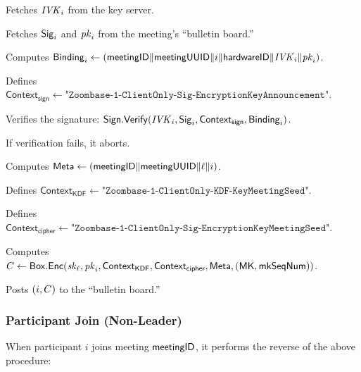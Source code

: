 \begingroup
\RaggedRight
\begin{enumerate*}
\item Fetches $\mathit{IVK}_i$ from the key server.
\item Fetches ${\sf Sig}_i$ and $\mathit{pk}_i$ from the meeting's ``bulletin board.''
\item Computes ${\sf Binding}_i \leftarrow \left( {\sf meetingID} \| \allowbreak {\sf meetingUUID} \| i \allowbreak
\| {\sf hardwareID} \| \mathit{IVK}_i \| \allowbreak \mathit{pk}_i \right)$.
\item Defines $\textsf{Context}_\textsf{sign} \leftarrow
\texttt{"Zoombase-1-ClientOnly-Sig-EncryptionKeyAnnouncement"}$.
\item Verifies the signature: ${\sf Sign}.\mathsf{Verify}(\mathit{IVK}_i, {\sf Sig}_i, \textsf{Context}_\textsf{sign},
{\sf Binding}_i)$.
\item If verification fails, it aborts.
\item Computes ${\sf Meta} \leftarrow \left( {\sf meetingID} \| \allowbreak {\sf meetingUUID} \| \allowbreak
\ell \| i \right)$.
\item Defines $\textsf{Context}_\textsf{KDF} \leftarrow
\texttt{"Zoombase-1-ClientOnly-KDF-KeyMeetingSeed"}$.
\item Defines $\textsf{Context}_\textsf{cipher} \leftarrow
\texttt{"Zoombase-1-ClientOnly-Sig-EncryptionKeyMeetingSeed"}$.
\item Computes $C \leftarrow {\sf Box}.\mathsf{Enc}(\mathit{sk}_\ell, \mathit{pk}_i, \textsf{Context}_\textsf{KDF},
    \textsf{Context}_\textsf{cipher}, {\sf Meta}, ({\sf MK}, \mathsf{mkSeqNum}))$.
   \label{participantJoinRekeyStart}
\item Posts $(i, C)$ to the ``bulletin board.''
   \label{participantJoinRekeyEnd}
\end{enumerate*}
\endgroup

\subsubsection{Participant Join (Non-Leader)}

When participant $i$ joins meeting ${\sf meetingID}$, it performs the reverse of the above procedure:

